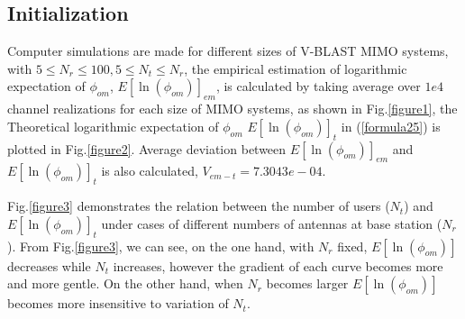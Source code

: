 \documentclass[12pt, draftclsnofoot, onecolumn]{IEEEtran}
\begin{document}
\begin{spacing}{2}
\section{Initialization}\label{Initialization}
 Computer simulations are made for different sizes of V-BLAST MIMO systems, with $5\leq N_{r} \leq 100, 5 \leq N_{t} \leq N_{r}$, the empirical estimation of logarithmic expectation of $\phi_{om}$, $E[\ln(\phi_{om})]_{em}$, is calculated by taking average over $1e4$ channel realizations for each size of MIMO systems, as shown in Fig.\ref{figure1}, the Theoretical logarithmic expectation of $\phi_{om}$ $E[\ln(\phi_{om})]_{t}$ in (\ref{formula25}) is plotted in Fig.\ref{figure2}. Average deviation between $E[\ln(\phi_{om})]_{em}$ and $E[\ln(\phi_{om})]_{t}$ is also calculated, $V_{em-t}= 7.3043e-04$.





Fig.\ref{figure3} demonstrates the relation between the number of users ($N_{t}$) and $E[\ln(\phi_{om})]_{t}$ under cases of different numbers of antennas at base station ($N_{r}$). From Fig.\ref{figure3}, we can see, on the one hand, with $N_{r}$ fixed, $E[\ln(\phi_{om})]$ decreases while $N_{t}$ increases, however the gradient of each curve becomes more and more gentle. On the other hand, when $N_{r}$ becomes larger $E[\ln(\phi_{om})]$ becomes more insensitive to variation of $N_{t}$.

\end{spacing}
\end{document}

